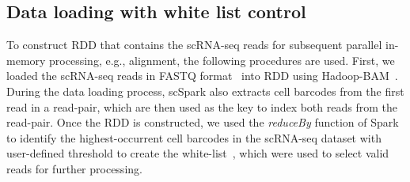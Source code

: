 \documentclass[conference]{IEEEtran}
\begin{document}

\subsection{Data loading with white list control}

To construct RDD that contains the scRNA-seq reads for subsequent parallel in-memory processing, e.g., alignment, the following procedures are used.
First, we loaded the scRNA-seq reads in FASTQ format~\cite{cock2010sanger} into RDD using Hadoop-BAM~\cite{hadoopBAM}.
During the data loading process, scSpark also extracts cell barcodes from the first read in a read-pair, which are then used as the key to index both reads from the read-pair.
Once the RDD is constructed, we used the \textit{reduceBy} function of Spark to identify the highest-occurrent cell barcodes in the scRNA-seq dataset with user-defined threshold to create the white-list~\cite{guo2018bioinformatics}, which were used to select valid reads for further processing. 


\end{document}
